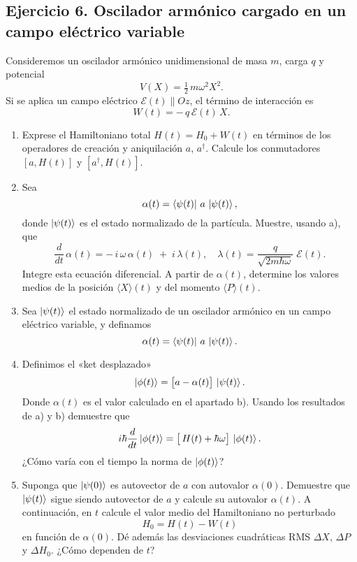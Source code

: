 \documentclass[a4paper,11pt]{article}
\begin{document}
\subsection*{Ejercicio 6. Oscilador armónico cargado en un campo eléctrico variable}

Consideremos un oscilador armónico unidimensional de masa \(m\), carga \(q\) y potencial  
\[
V(X)=\tfrac12\,m\omega^2X^2.
\]
Si se aplica un campo eléctrico \(\mathcal{E}(t)\parallel Oz\), el término de interacción es
\[
W(t)=-\,q\,\mathcal{E}(t)\,X.
\]
\begin{enumerate}
  \item Exprese el Hamiltoniano total \(H(t)=H_0+W(t)\) en términos de los operadores de creación y aniquilación \(a\), \(a^\dagger\). Calcule los conmutadores \([a,H(t)]\) y \([a^\dagger,H(t)]\).
  
  \item Sea
  \[
    \alpha(t)=\bra{\psi(t)}\,a\,\ket{\psi(t)},
  \]
  donde \(\ket{\psi(t)}\) es el estado normalizado de la partícula. Muestre, usando a), que  
  \[
    \frac{d}{dt}\,\alpha(t)
    = -\,i\,\omega\,\alpha(t)\;+\;i\,\lambda(t),
    \quad
    \lambda(t)=\frac{q}{\sqrt{2m\hbar\omega}}\;\mathcal{E}(t).
  \]
  Integre esta ecuación diferencial. A partir de \(\alpha(t)\), determine los valores medios de la posición \(\langle X\rangle(t)\) y del momento \(\langle P\rangle(t)\).

  \item Sea \(\ket{\psi(t)}\) el estado normalizado de un oscilador armónico en un campo eléctrico variable, y definamos
\[
\alpha(t)=\bra{\psi(t)}\,a\,\ket{\psi(t)}.
\]
  \item Definimos el «ket desplazado»
  \[
    \ket{\phi(t)} = \bigl[a - \alpha(t)\bigr]\,\ket{\psi(t)}.
  \]
  Donde \(\alpha(t)\) es el valor calculado en el apartado b). Usando los resultados de a) y b) demuestre que
  \[
    i\hbar\frac{d}{dt}\ket{\phi(t)}
    = \bigl[\,H(t)+\hbar\omega\bigr]\,\ket{\phi(t)}.
  \]
  ¿Cómo varía con el tiempo la norma de \(\ket{\phi(t)}\)?

  \item Suponga que \(\ket{\psi(0)}\) es autovector de \(a\) con autovalor \(\alpha(0)\). Demuestre que \(\ket{\psi(t)}\) sigue siendo autovector de \(a\) y calcule su autovalor \(\alpha(t)\).  
  A continuación, en \(t\) calcule el valor medio del Hamiltoniano no perturbado
  \[
    H_0 = H(t) - W(t)
  \]
  en función de \(\alpha(0)\). Dé además las desviaciones cuadráticas RMS \(\Delta X\), \(\Delta P\) y \(\Delta H_0\). ¿Cómo dependen de \(t\)?


\end{enumerate}
\end{document}
